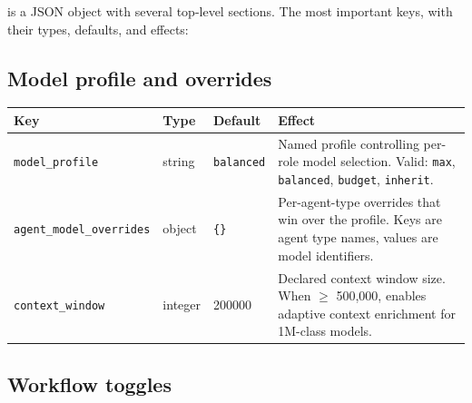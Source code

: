 \documentclass[11pt,letterpaper,openany]{book}
\begin{document}
 is a JSON object with several top-level sections. The most important keys, with their types, defaults, and effects:

\subsection*{Model profile and overrides}

\begin{center}
\footnotesize
\begin{longtable}{lll p{6.2cm}}
\toprule
Key & Type & Default & Effect \\
\midrule
\endhead
\texttt{model\_profile} & string & \texttt{balanced} & Named profile controlling per-role model selection. Valid: \texttt{max}, \texttt{balanced}, \texttt{budget}, \texttt{inherit}. \\
\texttt{agent\_model\_overrides} & object & \texttt{\{\}} & Per-agent-type overrides that win over the profile. Keys are agent type names, values are model identifiers. \\
\texttt{context\_window} & integer & 200000 & Declared context window size. When $\geq$ 500{,}000, enables adaptive context enrichment for 1M-class models. \\
\bottomrule
\end{longtable}
\end{center}

\subsection*{Workflow toggles}
\end{document}

